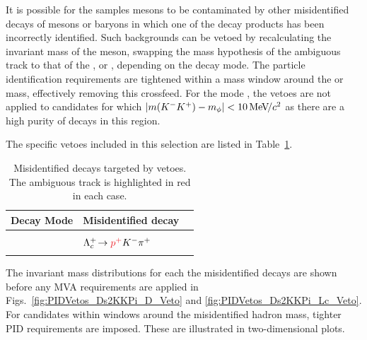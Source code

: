 It is possible for the samples \Dsp mesons to be contaminated by other misidentified decays of \Dp mesons or \Lc baryons in which one of the decay products has been incorrectly identified.
Such backgrounds can be vetoed by recalculating the invariant mass of the \Dsp meson, swapping the mass hypothesis of the ambiguous track to that of the \kaon, \pion or \proton, depending on the decay mode. 
The particle identification requirements are tightened within a mass window around the \Dp or \Lc mass, effectively removing this crossfeed. For the mode \decay{\Dsp}{\Kp\Km\pip}, the vetoes are not applied to candidates for which $|m({{K}^-}{{K}^+})-m_{\phi}| < 10{\mathrm{\,Me\kern -0.1em V\!/}c^2}$ as there are a high purity of \decay{\Dsp}{\Kp\Km\pip} decays in this region.

The specific vetoes included in this selection are listed in Table~\ref{table:pidvetos}. 
\begin{table}[!ht]
\centering
\begin{tabular}{ l l l }
\hline
Decay Mode & Misidentified decay\\
\hline
\decay{\Dsp}{{\color{Red}\Kp}\Km\pip}   & \decay{\Dp}{{\color{Red}\pip}\Km\pip}    \\
                           & $\decay{\Lc}{{\color{Red}\Pp^{+}}\Km\pip}$     \\
\hline
\decay{\Dsp}{{\color{Red}\Kp}\pim\pip}  & \decay{\Dp}{{\color{Red}\pip}\pim\pip}   \\

\hline
\end{tabular}
\caption{Misidentified decays targeted by vetoes. The ambiguous track is highlighted in red in each case.}
\label{table:pidvetos}

\end{table}
The invariant mass distributions for each the misidentified \decay{\Dsp}{\Kp\Km\pip} decays are shown before any MVA requirements are applied in Figs.~\ref{fig:PIDVetos_Ds2KKPi_D_Veto} and \ref{fig:PIDVetos_Ds2KKPi_Lc_Veto}. For candidates within windows around the misidentified hadron mass, tighter PID requirements are imposed. These are illustrated in two-dimensional plots. 



